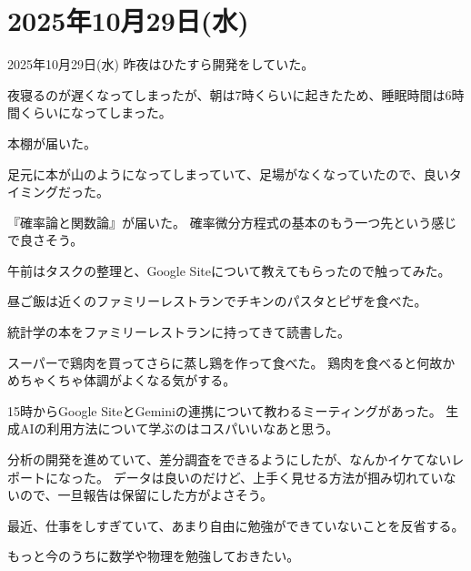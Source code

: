 \documentclass[dvipdfmx, autodetect-engine, aspectratio=169, 10.5pt]{beamer}
\begin{document}
\section{2025年10月29日(水)}
\begin{frame}{2025年10月29日(水)}
	\scriptsize
	昨夜はひたすら開発をしていた。

	夜寝るのが遅くなってしまったが、朝は7時くらいに起きたため、睡眠時間は6時間くらいになってしまった。

	本棚が届いた。

	足元に本が山のようになってしまっていて、足場がなくなっていたので、良いタイミングだった。

	『確率論と関数論』が届いた。
	確率微分方程式の基本のもう一つ先という感じで良さそう。

	午前はタスクの整理と、Google Siteについて教えてもらったので触ってみた。

	昼ご飯は近くのファミリーレストランでチキンのパスタとピザを食べた。

	統計学の本をファミリーレストランに持ってきて読書した。

	スーパーで鶏肉を買ってさらに蒸し鶏を作って食べた。
	鶏肉を食べると何故かめちゃくちゃ体調がよくなる気がする。

	15時からGoogle SiteとGeminiの連携について教わるミーティングがあった。
	生成AIの利用方法について学ぶのはコスパいいなあと思う。

	分析の開発を進めていて、差分調査をできるようにしたが、なんかイケてないレポートになった。
	データは良いのだけど、上手く見せる方法が掴み切れていないので、一旦報告は保留にした方がよさそう。

	最近、仕事をしすぎていて、あまり自由に勉強ができていないことを反省する。

	もっと今のうちに数学や物理を勉強しておきたい。
\end{frame}
\end{document}
